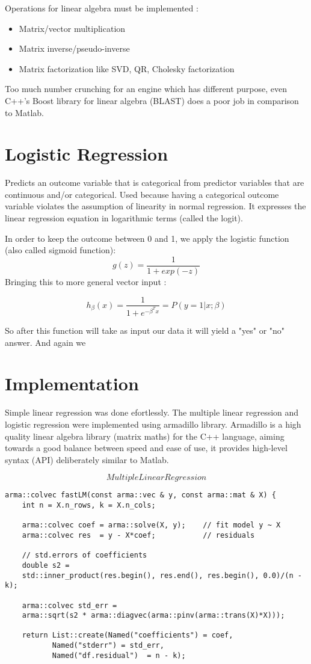 \documentclass[12pt]{article}
\begin{document}
Operations for linear algebra must be implemented :
\begin{itemize}
\item Matrix/vector multiplication
\item Matrix inverse/pseudo-inverse
\item Matrix factorization like SVD, QR, Cholesky factorization
\end{itemize}
Too much number crunching for an engine which has different purpose, even C++'s Boost library for linear algebra (BLAST) does a poor job in comparison to Matlab.



\section{Logistic Regression}
Predicts an outcome variable that is categorical from
predictor variables that are continuous and/or categorical. 
Used because having a categorical outcome variable violates
the assumption of linearity in normal regression.
It expresses the linear regression equation in logarithmic
terms (called the logit). 

In order to keep the outcome between 0 and 1, we apply the logistic function (also called sigmoid function):
$$g(z) = \frac{1}{1 + exp(-z)}$$
Bringing this to more general vector input :

$$h_\beta(x)=\frac{1}{1+e^{-\beta^Tx}}=P(y=1|x;\beta)$$

So after this function will take as input our data it will yield a "yes" or "no" answer.
And again we 

\begin{itemize}
\end{itemize}

\section{Implementation}
Simple linear regression was done efortlessly. 
The multiple linear regression and logistic regression were implemented using armadillo library.
Armadillo is a high quality linear algebra library (matrix maths) for the C++ language, aiming towards a good balance between speed and ease of use, it provides high-level syntax (API) deliberately similar to Matlab. 

$$Multiple Linear Regression$$

\begin{verbatim}
arma::colvec fastLM(const arma::vec & y, const arma::mat & X) { 
	int n = X.n_rows, k = X.n_cols;

	arma::colvec coef = arma::solve(X, y);    // fit model y ~ X
	arma::colvec res  = y - X*coef;           // residuals

	// std.errors of coefficients
	double s2 = 
	std::inner_product(res.begin(), res.end(), res.begin(), 0.0)/(n - k);

	arma::colvec std_err = 
	arma::sqrt(s2 * arma::diagvec(arma::pinv(arma::trans(X)*X)));

	return List::create(Named("coefficients") = coef,
	       Named("stderr") = std_err, 
	       Named("df.residual")  = n - k);
\end{verbatim}
\end{document}
